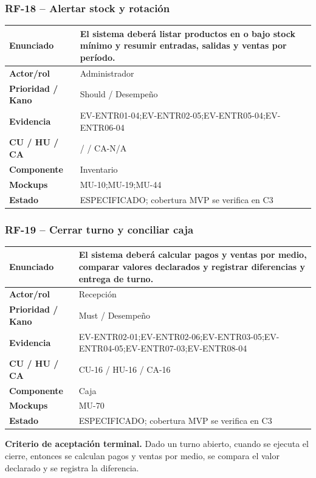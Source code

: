 \documentclass[11pt,a4paper,twoside]{article}
\begin{document}
\subsubsection{RF-18 -- Alertar stock y rotación}
\begin{tabularx}{\textwidth}{|>{\bfseries}p{3.2cm}|X|}\hline
Enunciado & El sistema deberá listar productos en o bajo stock mínimo y resumir entradas, salidas y ventas por período. \\ \hline
Actor/rol & Administrador \\ \hline
Prioridad / Kano & Should / Desempeño \\ \hline
Evidencia & EV-ENTR01-04;EV-ENTR02-05;EV-ENTR05-04;EV-ENTR06-04 \\ \hline
CU / HU / CA &  /  / CA-N/A \\ \hline
Componente & Inventario \\ \hline
Mockups & MU-10;MU-19;MU-44 \\ \hline
Estado & ESPECIFICADO; cobertura MVP se verifica en C3 \\ \hline
\end{tabularx}
\subsubsection{RF-19 -- Cerrar turno y conciliar caja}
\begin{tabularx}{\textwidth}{|>{\bfseries}p{3.2cm}|X|}\hline
Enunciado & El sistema deberá calcular pagos y ventas por medio, comparar valores declarados y registrar diferencias y entrega de turno. \\ \hline
Actor/rol & Recepción \\ \hline
Prioridad / Kano & Must / Desempeño \\ \hline
Evidencia & EV-ENTR02-01;EV-ENTR02-06;EV-ENTR03-05;EV-ENTR04-05;EV-ENTR07-03;EV-ENTR08-04 \\ \hline
CU / HU / CA & CU-16 / HU-16 / CA-16 \\ \hline
Componente & Caja \\ \hline
Mockups & MU-70 \\ \hline
Estado & ESPECIFICADO; cobertura MVP se verifica en C3 \\ \hline
\end{tabularx}
\textbf{Criterio de aceptación terminal.} Dado un turno abierto, cuando se ejecuta el cierre, entonces se calculan pagos y ventas por medio, se compara el valor declarado y se registra la diferencia.
\end{document}
